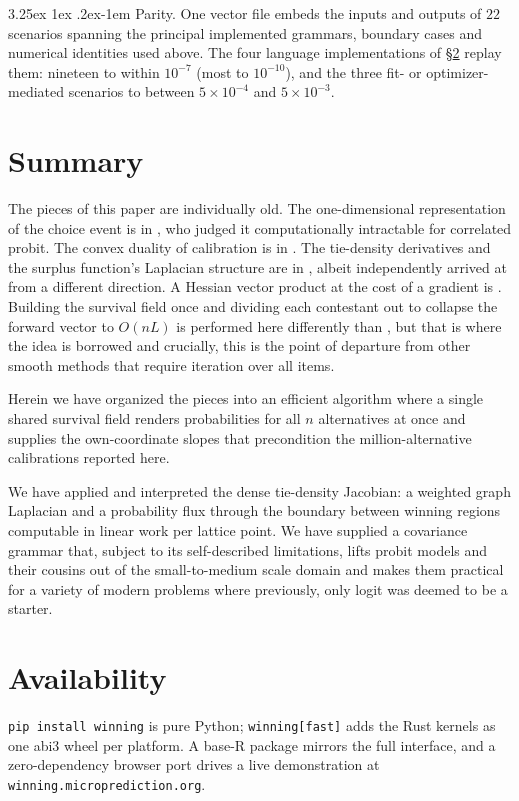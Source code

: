 \documentclass[11pt]{article}
\makeatletter
\renewcommand\paragraph{\@startsection{paragraph}{4}{\z@}%
  {3.25ex \@plus1ex \@minus.2ex}{-1em}%
  {\normalfont\normalsize\itshape}}
\makeatother
\begin{document}
\paragraph{Parity.} One vector file embeds the inputs and outputs of
$22$ scenarios spanning the principal implemented grammars, boundary
cases and numerical identities used above. The four language
implementations of \S\ref{sec:avail} replay them: nineteen to within
$10^{-7}$ (most to $10^{-10}$), and the three fit- or optimizer-mediated
scenarios to between $5\times10^{-4}$ and $5\times10^{-3}$.

\section{Summary}\label{sec:summary}

The pieces of this paper are individually old. The one-dimensional
representation of the choice event is in \citet{domencich1975}, who
judged it computationally intractable for correlated probit. The convex
duality of calibration is in \citet{li2018}. The tie-density
derivatives and the surplus function's Laplacian structure are in
\citet{muller2022}, albeit independently arrived at from a different direction. A Hessian vector product at the cost of a gradient
is \citet{pearlmutter1994}. Building the survival field once and dividing each contestant out to collapse the forward vector to $O(nL)$ is performed here differently than \citealt{cotton2021}, but that is where the idea is borrowed and crucially, this is the point of departure from other smooth methods that require iteration over all items.

Herein we have organized the pieces into an efficient algorithm where a
single shared survival field renders probabilities for all $n$
alternatives at once and supplies the own-coordinate slopes that
precondition the million-alternative calibrations reported here.

We have applied and interpreted the dense tie-density Jacobian: a weighted graph Laplacian and a probability flux through the boundary between winning regions computable in linear work per lattice point. We have supplied a covariance grammar that, subject to its self-described limitations, lifts probit models and their cousins out of the small-to-medium scale domain and makes them practical for a variety of modern problems where previously, only logit was deemed to be a starter.


\section{Availability}\label{sec:avail}
\texttt{pip install winning} is pure Python; \texttt{winning[fast]} adds the
Rust kernels as one abi3 wheel per platform. A base-R package mirrors the full
interface, and a zero-dependency browser port drives a live demonstration at
\texttt{winning.microprediction.org}.
\end{document}
